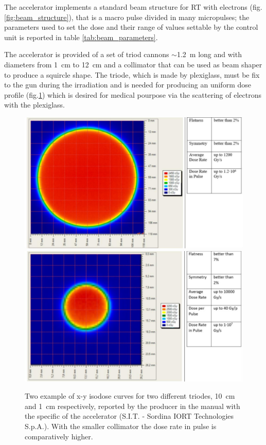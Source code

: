       The accelerator implements a standard beam structure for RT with electrons (fig. \ref{fig:beam_structure}), that is a macro pulse divided in many micropulses; the parameters used to set the dose and their range of values settable by the control unit is reported in table \ref{tab:beam_parameters}. 

      The accelerator is provided of a set of triod cannons $\sim$\SI{1.2}{m} long and with diameters from \SI{1}{cm} to \SI{12}{cm} and a collimator that can be used as beam shaper to produce a squircle shape.
      The triode, which is made by plexiglass, must be fix to the gun during the irradiation and is needed for producing an uniform dose profile (fig.\ref{fig:dose_profile}) which is desired for medical pourpose via the scattering of electrons with the plexiglass.
      \begin{figure}[h!]
         \centering
         \includegraphics[width=.49\linewidth]{figures/test_beam/dose_profile_10cm.pdf}
         \includegraphics[width=.49\linewidth]{figures/test_beam/dose_profile_1cm.pdf}
         \caption{Two example of x-y isodose curves for two different triodes, \SI{10}{cm} and \SI{1}{cm} respectively, reported by the producer in the manual with the specific of the accelerator (S.I.T. - Sordina IORT Technologies S.p.A.). With the smaller collimator the dose rate in pulse is comparatively higher.}
         \label{fig:dose_profile}
      \end{figure}  

